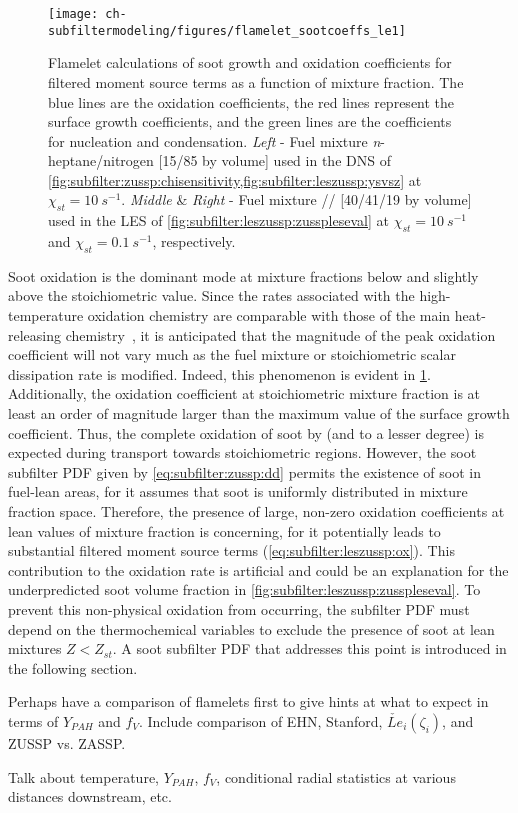 \begin{figure}[htb]
  \centering
  \texttt{[image: ch-subfiltermodeling/figures/flamelet\_sootcoeffs\_le1]}
  \caption[Soot Growth and Oxidation Coefficients, 1/\texorpdfstring{$\tau$}{t} vs. \texorpdfstring{$Z$}{Z}]{Flamelet calculations of soot growth and oxidation coefficients for filtered moment source terms as a function of mixture fraction. The blue lines are the oxidation coefficients, the red lines represent the surface growth coefficients, and the green lines are the coefficients for nucleation and condensation. \textit{Left} - Fuel mixture \textit{n}-heptane/nitrogen [15/85 by volume] used in the DNS of \cref{fig:subfilter:zussp:chisensitivity,fig:subfilter:leszussp:ysvsz} at $\chi_{st} = 10\ s^{-1}$. \textit{Middle} \& \textit{Right} - Fuel mixture // [40/41/19 by volume] used in the LES of \cref{fig:subfilter:leszussp:zusspleseval} at $\chi_{st} = 10\ s^{-1}$ and $\chi_{st} = 0.1\ s^{-1}$, respectively.}
  \label{fig:subfilter:leszussp:kvsz}
\end{figure}

Soot oxidation is the dominant mode at mixture fractions below and slightly above the stoichiometric value. Since the rates associated with the high-temperature oxidation chemistry are comparable with those of the main heat-releasing chemistry~\cite{guo2016}, it is anticipated that the magnitude of the peak oxidation coefficient will not vary much as the fuel mixture or stoichiometric scalar dissipation rate is modified. Indeed, this phenomenon is evident in \cref{fig:subfilter:leszussp:kvsz}. Additionally, the oxidation coefficient at stoichiometric mixture fraction is at least an order of magnitude larger than the maximum value of the surface growth coefficient. Thus, the complete oxidation of soot by  (and  to a lesser degree) is expected during transport towards stoichiometric regions. However, the soot subfilter PDF given by \cref{eq:subfilter:zussp:dd} permits the existence of soot in fuel-lean areas, for it assumes that soot is uniformly distributed in mixture fraction space. Therefore, the presence of large, non-zero oxidation coefficients at lean values of mixture fraction is concerning, for it potentially leads to substantial filtered moment source terms (\cref{eq:subfilter:leszussp:ox}). This contribution to the oxidation rate is artificial and could be an explanation for the underpredicted soot volume fraction in \cref{fig:subfilter:leszussp:zusspleseval}. To prevent this non-physical oxidation from occurring, the subfilter PDF must depend on the thermochemical variables to exclude the presence of soot at lean mixtures $Z < Z_{st}$. A soot subfilter PDF that addresses this point is introduced in the following section.

Perhaps have a comparison of flamelets first to give hints at what to expect in terms of $Y_{PAH}$ and $f_V$. Include comparison of EHN, Stanford, $\check{Le}_i(\zeta_i)$, and ZUSSP vs. ZASSP.

Talk about temperature, $Y_{PAH}$, $f_V$, conditional radial statistics at various distances downstream, etc.
